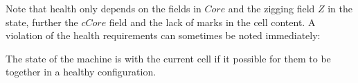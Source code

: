\documentclass[12pt]{memoir}
\newcommand{\authnote}[3]
{{ \textcolor{#3}{$\langle\hspace{-0.2em}\langle$\textsf{\footnotesize #1: #2}$\rangle\hspace{-0.2em}\rangle$}}}
\newcommand{\authnote}[2]{}
\newcommand{\Pnote}[1]{{\authnote{Peter}{#1}{cyan}}}
\newcommand{\Inote}[1]{{\authnote{Ilir}{#1}{blue}}}
\newcommand{\fld}[1]{\ensuremath{\textit{#1}}}
\def\B{B}
\newcommand{\Z}{Z}
\newcommand{\Addr}{\fld{Addr}}
\newcommand{\cAddr}{\fld{cAddr}}
\newcommand{\Core}{\fld{Core}}
\newcommand{\cCore}{\fld{cCore}}
\newcommand{\cKind}{\fld{cKind}}
\newcommand{\Sweep}{\fld{Sw}}
\newcommand{\cSweep}{\fld{cSw}}
\begin{document}
Note that health only depends on the fields in \( \Core \) and
the zigging field \( \Z \) in the state, further the  \( \cCore \) field
and the lack of marks in the cell content.
A violation of the health requirements can sometimes be noted immediately:

\begin{definition}[Coordination] \label{def:coordinated}
   The state of the machine is  with the current cell
   if it possible for them to be together in a healthy configuration.
\end{definition}


    

\end{document}
